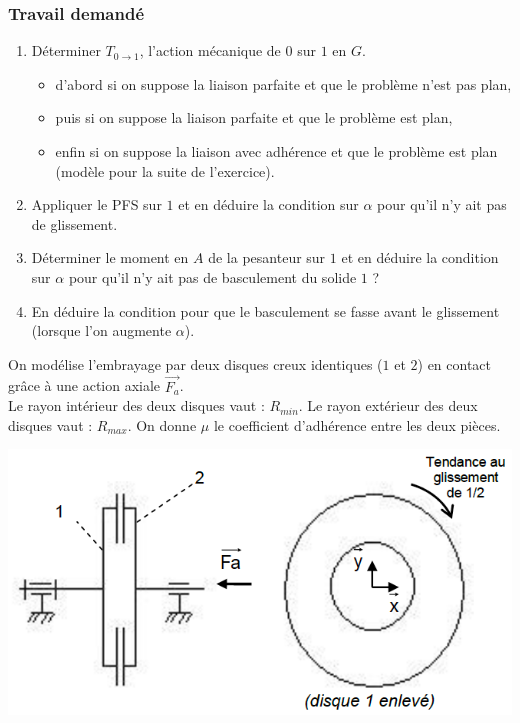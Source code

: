 \subsubsection{Travail demandé}
\begin{enumerate}
\item Déterminer $T_{0\rightarrow1}$, l'action mécanique de $0$ sur $1$ en $G$.
\begin{itemize}
\item d’abord si on suppose la liaison parfaite et que le problème n’est pas plan,
\item puis si on suppose la liaison parfaite et que le problème est plan,
\item enfin si on suppose la liaison avec adhérence et que le problème est plan (modèle pour la
suite de l’exercice).
\end{itemize}
\item Appliquer le PFS sur $1$ et en déduire la condition sur $\alpha$ pour qu’il n’y ait pas de glissement.
\item Déterminer le moment en $A$ de la pesanteur sur $1$ et en déduire la condition sur $\alpha$ pour qu’il n’y ait pas de basculement du solide $1$ ?
\item En déduire la condition pour que le basculement se fasse avant le glissement (lorsque l'on augmente $\alpha$).
\end{enumerate}


\newpage



On modélise l'embrayage par deux disques creux identiques ($1$ et $2$) en contact grâce à une action axiale $\overrightarrow{F_a}$.\\
Le rayon intérieur des deux disques vaut : $R_{min}$. Le rayon extérieur des deux disques vaut : $R_{max}$. On donne $\mu$ le coefficient d’adhérence entre
les deux pièces.

\begin{center}
\includegraphics[scale=0.5]{png/embrayage.png}
\end{center}

